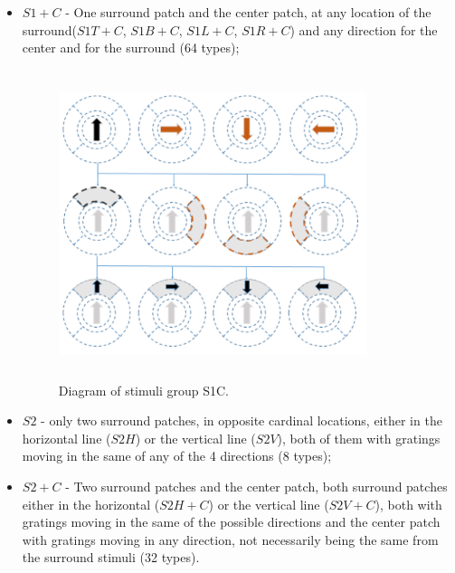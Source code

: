 \begin{itemize}
\item $S1+C$ - One surround patch and the center patch, at any location of the surround($S1T+C$, $S1B+C$, $S1L+C$, $S1R+C$) and any direction for the center and for the surround (64 types);

\begin{figure}[H] \centering \includegraphics[width=9cm,height=9cm,keepaspectratio]{Figures/4.Chapter/S1C.PNG} \caption{Diagram of stimuli group S1C.} \end{figure}

\item $S2$ - only two surround patches, in opposite cardinal locations, either in the horizontal line ($S2H$) or the vertical line ($S2V$), both of them with gratings moving in the same of any of the 4 directions (8 types);


\item $S2+C$ - Two surround patches and the center patch, both surround patches either in the horizontal ($S2H+C$) or the vertical line ($S2V+C$), both with gratings moving in the same of the possible directions and the center patch with gratings moving in any direction, not necessarily being the same from the surround stimuli (32 types).
\end{itemize}

